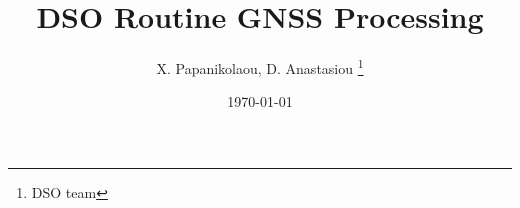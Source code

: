 \documentclass[oneside]{scrbook}
\title{DSO Routine GNSS Processing}
\author{X. Papanikolaou, D. Anastasiou \thanks{DSO team}}
\date{\today}
\begin{document}
\begin{titlepage}
\maketitle
\end{titlepage}

\frontmatter
\tableofcontents
\listoffigures
\listoftables





\printindex
\end{document}
